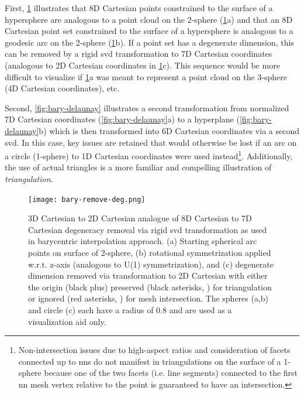 \documentclass[final,12pt]{elsarticle}
\begin{document}
First, \cref{fig:bary-remove-deg} illustrates that 8D Cartesian points constrained to the surface of a hypersphere are analogous to a point cloud on the 2-sphere (\cref{fig:bary-remove-deg}a) and that an 8D Cartesian point set constrained to the surface of a hypersphere is analogous to a geodesic arc on the 2-sphere (\cref{fig:bary-remove-deg}b). If a point set has a degenerate dimension, this can be removed by a rigid \gls{svd} transformation to 7D Cartesian coordinates (analogous to 2D Cartesian coordinates in \cref{fig:bary-remove-deg}c). This sequence would be more difficult to visualize if \cref{fig:bary-remove-deg}a was meant to represent a point cloud on the 3-sphere (4D Cartesian coordinates), etc.

Second, \cref{fig:bary-delaunay} illustrates a second transformation from normalized 7D Cartesian coordinates (\cref{fig:bary-delaunay}a) to a hyperplane (\cref{fig:bary-delaunay}b) which is then transformed into 6D Cartesian coordinates via a second \gls{svd}. In this case, key issues are retained that would otherwise be lost if an arc on a circle (1-sphere) to 1D Cartesian coordinates were used instead\footnote{Non-intersection issues due to high-aspect ratios and consideration of facets connected up to  \glspl{nn} do not manifest in triangulations on the surface of a 1-sphere because one of the two facets (i.e. line segments) connected to the first \gls{nn} mesh vertex relative to the \outpt{} point is guaranteed to have an intersection.}. Additionally, the use of actual triangles is a more familiar and compelling illustration of \textit{triangulation}.

\begin{figure}
	\centering
	\texttt{[image: bary-remove-deg.png]}
	\caption{3D Cartesian to 2D Cartesian analogue of 8D Cartesian to 7D Cartesian degeneracy removal via rigid \gls{svd} transformation as used in barycentric interpolation approach. (a) Starting spherical arc points on surface of 2-sphere, (b) rotational symmetrization applied w.r.t. z-axis (analogous to U(1) symmetrization), and (c) degenerate dimension removed via  transformation to 2D Cartesian with either the origin (black plus) preserved (black asterisks, ) for triangulation or ignored (red asterisks, ) for mesh intersection. The spheres (a,b) and circle (c) each have a radius of 0.8 and are used as a visualization aid only.}
	\label{fig:bary-remove-deg}
\end{figure}
\end{document}
